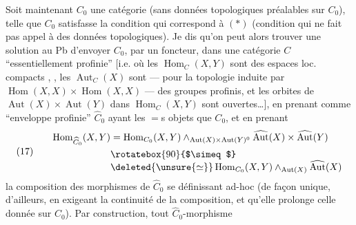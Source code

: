 Soit maintenant $C_0$ une catégorie (sans
données topologiques préalables sur $C_0$),
telle que $C_0$ satisfasse la condition
qui correspond à $(*)$ (condition qui ne
fait pas appel à des données topologiques).
Je dis qu'on peut alors trouver une
solution au Pb d'envoyer $C_0$, par un foncteur,
dans une catégorie $C$ ``essentiellement profinie''
[i.e. où les $\operatorname{Hom}_C(X,Y)$ sont des espaces loc. compacts
, , les $\operatorname{Aut}_C(X)$ sont --- pour la topologie
induite par $\operatorname{Hom}(X,X)\times\operatorname{Hom}(X,X)$ --- des
groupes profinis, et les orbites de $\operatorname{Aut}(X)\times\operatorname{Aut}(Y)$
dans $\operatorname{Hom}_C(X,Y)$ sont ouvertes\ldots], en prenant
comme ``enveloppe profinie'' $\widehat C_0$  ayant les
$=$s  objets que $C_0$, et en prenant
\[
(17)\qquad\begin{aligned}
\operatorname{Hom}_{\widehat C_0}(X,Y)&=\operatorname{Hom}_{C_0}(X,Y)\mathbin{\wedge}_{\operatorname{Aut}(X)\times\operatorname{Aut}(Y)^0}\widehat{\operatorname{Aut}}(X)\times\widehat{\operatorname{Aut}}(Y)\\
&\rotatebox{90}{$\simeq$}\\[-1ex]
&\deleted{\unsure{\simeq}}\operatorname{Hom}_{C_0}(X,Y)\mathbin{\wedge}_{\operatorname{Aut}(X)}\widehat{\operatorname{Aut}}(X)
\end{aligned}
\]
la composition des morphismes de $\widehat C_0$ se
définissant ad-hoc (de façon unique, d'ailleurs,
en exigeant la continuité de la composition, et
qu'elle prolonge celle donnée sur $C_0$).
Par construction, tout $\widehat C_0$-morphisme
